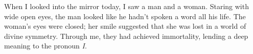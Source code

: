 \documentclass{article}
\begin{document}
\newline
When I looked into the mirror today, I saw a man and a woman. Staring
with wide open eyes, the man looked like he hadn't spoken a word all his
life. The woman's eyes were closed; her smile suggested that she was
lost in a world of divine symmetry. Through me, they had achieved
immortality, lending a deep meaning to the pronoun \textit{I}.
\newline
\end{document}
